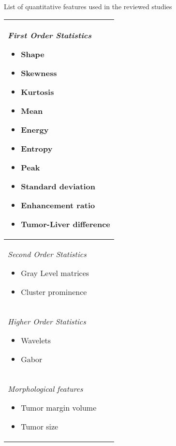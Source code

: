 \renewcommand{\arraystretch}{1}
\renewcommand{\baselinestretch}{1}

\begin{minipage}{17cm}
\begin{threeparttable} 
\caption{List of quantitative features used in the reviewed studies}
\label{tab:QuantitativeFeatures}
\begin{tabularx}{8cm}{|X|}
\hline
\emph{First Order Statistics}
\begin{itemize}
\itemsep0em 
\item Shape \cite{Cozzi2017}
\item Skewness \cite{Akai2018,Li2016,Zhou2017a}
\item Kurtosis \cite{Akai2018}
\item Mean \cite{Zhou2017a,Raman2015,Cozzi2017}
\item Energy \cite{Zhou2017a,Cozzi2017}
\item Entropy \cite{Peng2018,Akai2018}
\item Peak \cite{Bakr2017}
\item Standard deviation \cite{Xia2018}
\item Enhancement ratio \cite{Taouli2017}
\item Tumor-Liver difference \cite{Taouli2017}
\end{itemize}\\
\hline
\emph{Second Order Statistics} 
\begin{itemize}
\item Gray Level matrices \cite{Peng2018,Zheng2018,Cozzi2017}
\item Cluster prominence \cite{Xia2018}
\end{itemize}\\ \hline
\emph{Higher Order Statistics}
\begin{itemize}
\item Wavelets \cite{Chen2017,Li2016,Bakr2017}
\item Gabor \cite{Chen2017,Bakr2017}
\end{itemize}\\
\hline
\emph{Morphological features}
\begin{itemize}
\item Tumor margin volume \cite{Xia2018}
\item Tumor size\tnote{1} \cite{Renzulli2016,Taouli2017}
\end{itemize}\\
\hline
\end{tabularx}
\begin{tablenotes}

\end{tablenotes}
\end{threeparttable}
\end{minipage}
